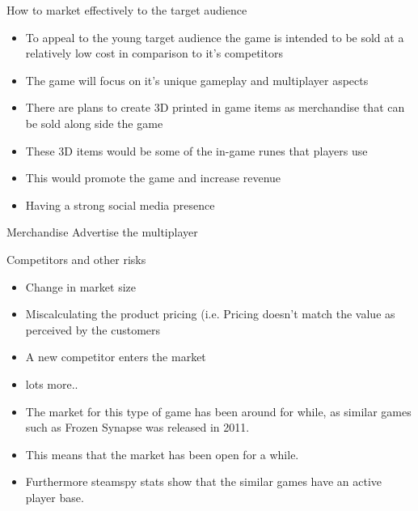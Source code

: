 \documentclass{beamer}
\begin{document}
\begin{frame}{How to market effectively to the target audience}
	\begin{itemize}
	\item To appeal to the young target audience the game is intended to be sold at a relatively low cost in comparison to it's competitors \pause
	\item The game will focus on it's unique gameplay and multiplayer aspects \pause	
	\end{itemize}	
	
	\begin{itemize}
		\item There are plans to create 3D printed in game items as merchandise that can be sold along side the game \pause
		\item These 3D items would be some of the in-game runes that players use \pause
		\item This would promote the game and increase revenue \pause
		\item Having a strong social media presence \pause
	\end{itemize}
	
	
	Merchandise
	Advertise the multiplayer
	
\end{frame}

\begin{frame}{Competitors and other risks}
	\begin{itemize}
		\item Change in market size \pause
		\item Miscalculating the product pricing (i.e. Pricing doesn't match the value as perceived by the customers \pause
		\item A new competitor enters the market \pause
		\item lots more.. \pause
	\end{itemize}
	\begin {itemize}
	\item The market for this type of game has been around for while, as similar games such as Frozen Synapse was released in 2011. \pause
	\item This means that the market has been open for a while. \pause
	\item Furthermore steamspy stats show that the similar games have an active player base. \pause
	\end{itemize}
	
	
	
	
\end{frame}
\end{document}
